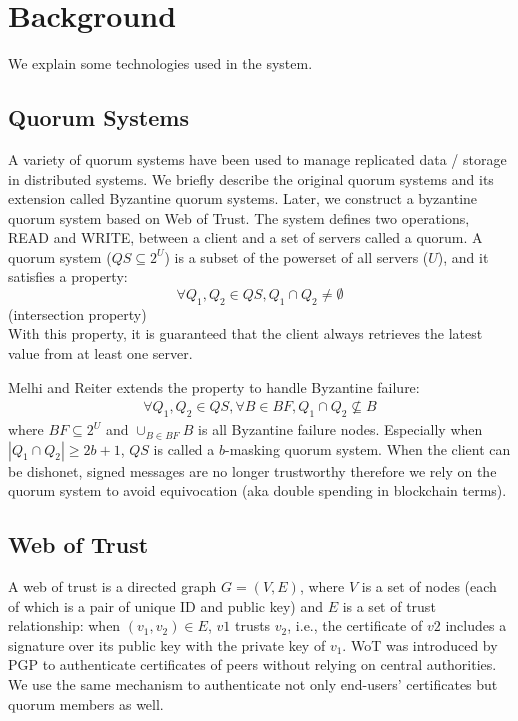 \documentclass[twoside,twocolumn,10pt,fleqn]{article}
\begin{document}
\section{Background}

We explain some technologies used in the system.

\subsection{Quorum Systems}
A variety of quorum systems have been used to manage replicated data /
storage in distributed systems. We briefly describe the original
quorum systems and its extension called Byzantine quorum
systems. Later, we construct a byzantine quorum system based on Web of
Trust.
The system defines two operations, READ and WRITE, between a client
and a set of servers called a quorum. A quorum system ($QS \subseteq
2^U$) is a subset of the powerset of all servers ($U$), and it
satisfies a property:
\[
  \forall Q_1, Q_2 \in QS, Q_1 \cap Q_2 \neq \emptyset
\]
\hfill (intersection property)\\

With this property, it is guaranteed that the client always retrieves
the latest value from at least one server.

Melhi and Reiter \cite{Delhi:1} extends the property to handle
Byzantine failure:
\begin{align*}
  \forall Q_1, Q_2 \in QS, \forall B \in BF, Q_1 \cap Q_2 \nsubseteq B
\end{align*}
where $BF \subseteq 2^U$ and $\cup_{B \in BF} B$ is all Byzantine
failure nodes.
Especially when $|Q_1 \cap Q_2| \geq 2b+1$, $QS$ is called a $b$-masking
quorum system. When the client can be dishonet, signed messages are no
longer trustworthy therefore we rely on the quorum system to avoid
equivocation (aka double spending in blockchain terms).

\subsection{Web of Trust}
A web of trust is a directed graph $G = (V, E)$, where $V$ is a set of
nodes (each of which is a pair of unique ID and public key) and $E$ is a
set of trust relationship: when $(v_1, v_2) \in E$, $v1$ trusts $v_2$,
i.e., the certificate of $v2$ includes a signature over its public key
with the private key of $v_1$. WoT was introduced by PGP to
authenticate certificates of peers without relying on central
authorities. We use the same mechanism to authenticate not only
end-users' certificates but quorum members as well.
\end{document}
